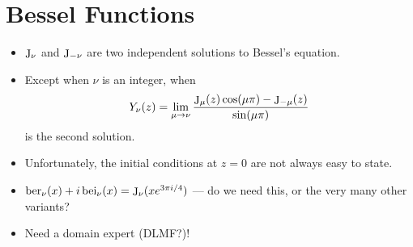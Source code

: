 \documentclass[11pt,a4paper]{artikel3}
\begin{document}
\section{Bessel Functions}
\begin{itemize}
\item $\mathop{\rm J}\nolimits_\nu$ and $\mathop{\rm J}\nolimits_{-\nu}$ are two independent solutions to Bessel's
equation.
\item Except when $\nu$ is an integer, when 
$$
Y_\nu(z)=\lim_{\mu\rightarrow\nu}\frac{\mathop{\rm J}\nolimits_\mu(z)\cos(\mu\pi)-\mathop{\rm J}\nolimits_{-\mu}(z)}{\sin(\mu\pi)}
$$
is the second solution.
\item Unfortunately, the initial conditions at $z=0$ are not always
easy to state. 
\item $\mathop{\rm ber}\nolimits_\nu(x)+i\mathop{\rm bei}\nolimits_\nu(x)=\mathop{\rm J}\nolimits_\nu(xe^{3\pi i/4})$ --- do we need this,
or the very many other variants?
\item Need a domain expert (DLMF?)!
\end{itemize}
\end{document}
